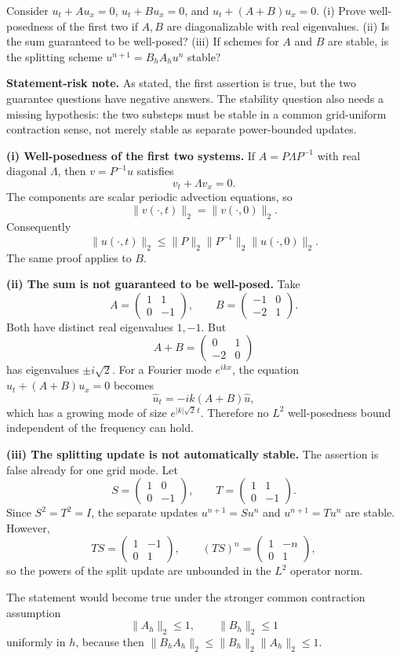 \begin{exercise}
Consider $u_t + A u_x = 0$, $u_t + B u_x = 0$, and $u_t + (A+B)u_x = 0$.
(i) Prove well-posedness of the first two if $A, B$ are diagonalizable with real eigenvalues.
(ii) Is the sum guaranteed to be well-posed?
(iii) If schemes for $A$ and $B$ are stable, is the splitting scheme $u^{n+1} = B_h A_h u^n$ stable?
\end{exercise}

\begin{solution}
\textbf{Statement-risk note.}
As stated, the first assertion is true, but the two guarantee questions have negative
answers. The stability question also needs a missing hypothesis: the two substeps must
be stable in a common grid-uniform contraction sense, not merely stable as separate
power-bounded updates.

\textbf{(i) Well-posedness of the first two systems.}
If $A=P\Lambda P^{-1}$ with real diagonal $\Lambda$, then $v=P^{-1}u$ satisfies
\[
v_t+\Lambda v_x=0.
\]
The components are scalar periodic advection equations, so
\[
\|v(\cdot,t)\|_2=\|v(\cdot,0)\|_2.
\]
Consequently
\[
\|u(\cdot,t)\|_2\leq \|P\|_2\|P^{-1}\|_2\|u(\cdot,0)\|_2.
\]
The same proof applies to $B$.

\textbf{(ii) The sum is not guaranteed to be well-posed.}
Take
\[
A=
\begin{pmatrix}
1&1\\
0&-1
\end{pmatrix},
\qquad
B=
\begin{pmatrix}
-1&0\\
-2&1
\end{pmatrix}.
\]
Both have distinct real eigenvalues $1,-1$. But
\[
A+B=
\begin{pmatrix}
0&1\\
-2&0
\end{pmatrix}
\]
has eigenvalues $\pm i\sqrt 2$. For a Fourier mode $e^{ikx}$, the equation
$u_t+(A+B)u_x=0$ becomes
\[
\widehat u_t=-ik(A+B)\widehat u,
\]
which has a growing mode of size $e^{|k|\sqrt 2\,t}$. Therefore no $L^2$ well-posedness
bound independent of the frequency can hold.

\textbf{(iii) The splitting update is not automatically stable.}
The assertion is false already for one grid mode. Let
\[
S=
\begin{pmatrix}
1&0\\
0&-1
\end{pmatrix},
\qquad
T=
\begin{pmatrix}
1&1\\
0&-1
\end{pmatrix}.
\]
Since $S^2=T^2=I$, the separate updates $u^{n+1}=Su^n$ and $u^{n+1}=Tu^n$ are stable.
However,
\[
TS=
\begin{pmatrix}
1&-1\\
0&1
\end{pmatrix},
\qquad
(TS)^n=
\begin{pmatrix}
1&-n\\
0&1
\end{pmatrix},
\]
so the powers of the split update are unbounded in the $L^2$ operator norm.

The statement would become true under the stronger common contraction assumption
\[
\|A_h\|_2\leq 1,\qquad \|B_h\|_2\leq 1
\]
uniformly in $h$, because then $\|B_hA_h\|_2\leq \|B_h\|_2\|A_h\|_2\leq 1$.
\end{solution}
